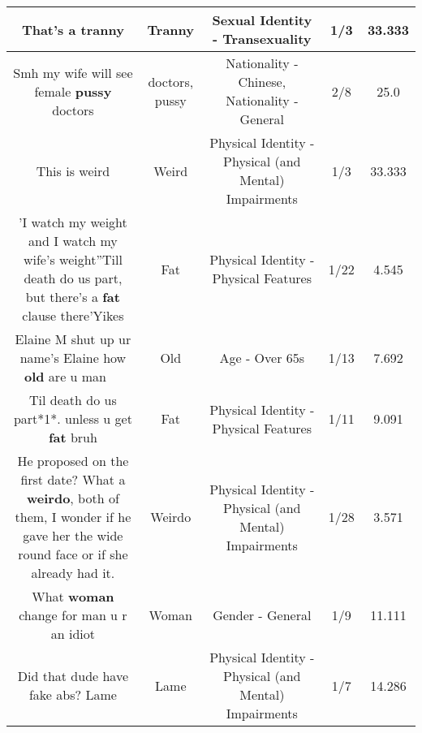 \documentclass[11pt]{article}
\newlength\mylength
\begin{document}
\begin{center}
\begin{longtable}{|C{.65\mylength}|C{.30\mylength}|C{.12\mylength}|C{.12\mylength}|C{.12\mylength}|}
  \small That's a tranny\normalsize   & Tranny & Sexual Identity - Transexuality & 1/3 & 33.333 \\  \hline
  \small Smh my wife will see female \textbf{pussy} doctors\normalsize   & doctors, pussy & Nationality - Chinese, Nationality - General & 2/8 & 25.0 \\  \hline
  \small This is weird\normalsize   & Weird & Physical Identity - Physical (and Mental) Impairments & 1/3 & 33.333 \\  \hline
  \small 'I watch my weight and I watch my wife's weight''Till death do us part, but there's a \textbf{fat} clause there'Yikes\normalsize   & Fat & Physical Identity - Physical Features & 1/22 & 4.545 \\  \hline
  \small Elaine M shut up ur name's Elaine how \textbf{old} are u man 🤣🤣🤣\normalsize   & Old & Age - Over 65s & 1/13 & 7.692 \\  \hline
  \small Til death do us part*1*. unless u get \textbf{fat} bruh\normalsize   & Fat & Physical Identity - Physical Features & 1/11 & 9.091 \\  \hline
  \small He proposed on the first date? What a \textbf{weirdo}, both of them, I wonder if he gave her the wide round face or if she already had it.\normalsize   & Weirdo & Physical Identity - Physical (and Mental) Impairments & 1/28 & 3.571 \\  \hline
  \small What \textbf{woman} change for man u r an idiot\normalsize   & Woman & Gender - General & 1/9 & 11.111 \\  \hline
  \small Did that dude have fake abs? Lame\normalsize   & Lame & Physical Identity - Physical (and Mental) Impairments & 1/7 & 14.286 \\  \hline

\end{longtable}
\end{center}
\end{document}
